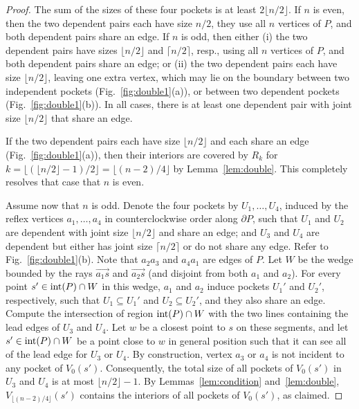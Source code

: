 \documentclass[12pt]{article}
\newcommand{\ceil}[1]{\lceil #1 \rceil}
\newcommand{\floor}[1]{{\lfloor #1 \rfloor}}
\begin{document}
\begin{proof}
The sum of the sizes of these four pockets is at least $2\floor{n/2}$. If $n$ is even, then the two dependent pairs each have size $n/2$, they use all $n$ vertices of $P$, and both dependent pairs share an edge. If $n$ is odd, then either (i) the two dependent pairs have sizes $\floor{n/2}$ and $\ceil{n/2}$, resp., using all $n$ vertices of $P$, and both dependent pairs share an edge; or (ii) the two dependent pairs each have size $\floor{n/2}$, leaving one extra vertex, which may lie on the boundary between two independent pockets (Fig.~\ref{fig:double1}(a)), or between two dependent pockets (Fig.~\ref{fig:double1}(b)). In all cases, there is at least one dependent pair with joint size $\floor{n/2}$ that share an edge.

If the two dependent pairs each have size $\floor{n/2}$ and each share an edge (Fig.~\ref{fig:double1}(a)), then their interiors are covered by $R_k$ for $k=\floor{(\floor{n/2}-1)/2} =\floor{(n-2)/4}$ by Lemma~\ref{lem:double}.
This completely resolves that case that $n$ is even.

Assume now that $n$ is odd. Denote the four pockets by $U_1,\ldots , U_4$, induced by the reflex vertices $a_1,\ldots , a_4$ in counterclockwise order along $\partial P$, such that $U_1$ and $U_2$ are dependent with joint size $\floor{n/2}$ and share an edge; and $U_3$ and $U_4$ are dependent but either has joint size $\ceil{n/2}$ or do not share any edge. Refer to Fig.~\ref{fig:double1}(b). Note that $a_2a_3$ and $a_4a_1$ are edges of $P$. Let $W$ be the wedge bounded by the rays $\overrightarrow{a_1s}$ and $\overrightarrow{a_2s}$ (and disjoint from both $a_1$ and $a_2$). For every point $s'\in {\rm int}(P)\cap W$ in this wedge, $a_1$ and $a_2$ induce pockets $U_1'$ and $U_2'$, respectively, such that $U_1\subseteq U_1'$ and $U_2\subseteq U_2'$, and they also share an edge. Compute the intersection of region ${\rm int}(P)\cap W$ with the two lines containing the lead edges of $U_3$ and $U_4$.
Let $w$ be a closest point to $s$ on these segments, and let $s'\in {\rm int}(P)\cap W$ be a point close to $w$ in general position such that it can see all of the lead edge for $U_3$ or $U_4$. By construction, vertex $a_3$ or $a_4$ is not incident to any pocket of $V_0(s')$. Consequently, the total size of all pockets of $V_0(s')$ in $U_3$ and $U_4$ is at most $\floor{n/2}-1$. By Lemmas~\ref{lem:condition} and~\ref{lem:double}, $V_{\floor{(n-2)/4}}(s')$ contains the interiors
of all pockets of $V_0(s')$, as claimed.
\end{proof}
\end{document}
